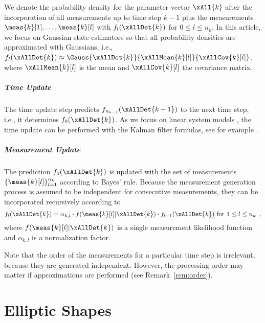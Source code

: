 \documentclass[preprint,1p,11pt]{ISAS_IR}
\begin{document}
We denote the probability density for the  parameter vector $\xAll{k}$   after the incorporation of  all measurements up to time step $k-1$ plus the measurements $\meas{k}[1],\ldots,\meas{k}[l]$ with         $f_{l}(\xAllDet{k})$ for $0\leq l \leq n_k$. In this article, we focus on Gaussian state estimators so that all probability densities are approximated with    Gaussians, i.e.,  $f_{l}(\xAllDet{k})\approx \Gauss{\xAllDet{k}}{\xAllMean{k}[l]}{\xAllCov{k}[l]}$, where $\xAllMean{k}[l]$ is the mean and $\xAllCov{k}[l]$ the covariance matrix.


 
\paragraph*{Time Update}
The time update  step predicts  $f_{n_{k-1}}(\xAllDet{k-1})$     to the next time step, i.e.,  it determines  $f_{0}( \xAllDet{k}  )$. 
As we focus on linear system models , the time update can be performed with the Kalman filter formulas, see for example \cite{Bar-Shalom2002}.



\paragraph*{Measurement Update}
The prediction $f_{0}( \xAllDet{k})$ is  updated with the set of measurements   $\{ \meas{k}[l] \}_{l=1}^{n_k}  $   according to Bayes' rule.
Because the measurement generation process is assumed to be independent for consecutive measurements,  they can be incorporated recursively according to
$$f_{l}(\xAllDet{k})=\alpha_ {k,l}\cdot f(\meas{k}[l]| \xAllDet{k}  ) \cdot f_{l-1}( \xAllDet{k}  )    \text{  for  }  1\leq l \leq n_k    \enspace ,$$
where  $f(\meas{k}[l]| \xAllDet{k}) $ is a single measurement likelihood function and $\alpha_{k,l}$ is a normalization factor.
 
Note that the order of the measurements for a particular time step is irrelevant, because they are generated independent.
However, the processing order may matter if approximations are performed (see Remark~\ref{rem:order}). 
 






\chapter{Elliptic Shapes}\label{sec:rhm_ellipse}
\end{document}
